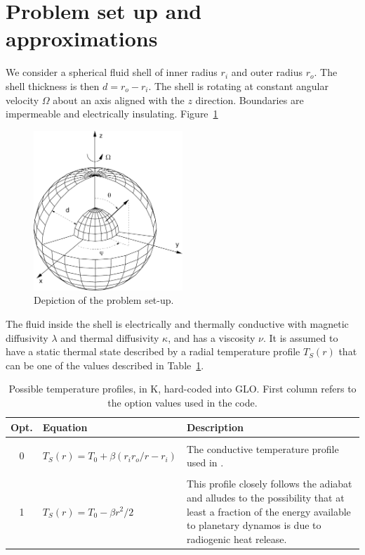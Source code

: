 \documentclass[a4paper,10pt]{book}
\begin{document}
\section{Problem set up and approximations}
\label{s:problemSetup}
We consider a spherical fluid shell of inner radius $r_i$ and outer radius
$r_o$. The shell thickness is then $d = r_o - r_i$. The shell is rotating at
constant angular velocity $\Omega$ about an axis aligned with the $z$ direction.
Boundaries are impermeable and electrically insulating. Figure~\ref{f:setup}
\begin{figure}[htb]
\centering
\includegraphics[width=0.5\textwidth]{figs/sphshell}
\caption{Depiction of the problem set-up.}
\label{f:setup}
\end{figure}

The fluid inside the shell is electrically and thermally conductive with
magnetic diffusivity $\lambda$ and thermal diffusivity $\kappa$, and has a
viscosity $\nu$. It is assumed to have a static thermal state described by a
radial temperature profile $T_S (r)$ that can be one of the values described in
Table~\ref{t:t_profiles}.
\begin{table}[htb]
\centering
\begin{tabular}{|c|lp{}|}\hline
 Opt. & Equation & Description\\\hline
  &                          & \\
 0&$T_S(r) = T_0 + \beta(r_i r_o/r - r_i)$ & The conductive temperature
 profile used in \citep{ChristensenEtAl01}.
 \\\hline
  &                          & \\
 1&$T_S(r) = T_0 - \beta r^2/2$    & This profile closely
follows the adiabat \citep{LabrossePoirier1997,DaviesGubbins2011} and alludes to
the possibility that at least a fraction of the energy available to planetary
dynamos is due to radiogenic heat release. \\ \hline
\end{tabular}
\caption{Possible temperature profiles, in K, hard-coded into GLO. First column
refers to the option values used in the code.}
\label{t:t_profiles}
\end{table}
\end{document}
